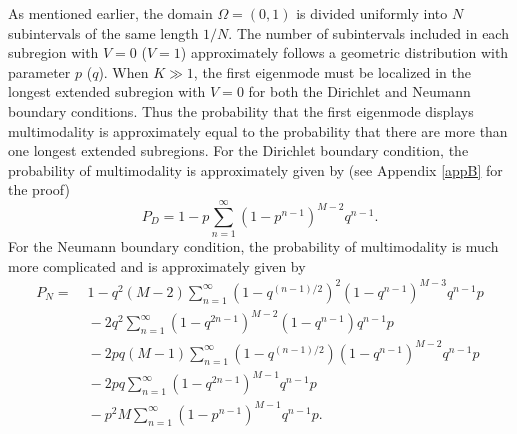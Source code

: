 \documentclass[a4paper,11pt]{article}
\begin{document}
As mentioned earlier, the domain $\Omega = (0, 1)$ is divided uniformly into $N$ subintervals of the same length $1/N$. The number of subintervals included in each subregion with $V = 0$ ($V = 1$) approximately follows a geometric distribution with parameter $p$ ($q$). When $K\gg 1$, the first eigenmode must be localized in the longest extended subregion with $V = 0$ for both the Dirichlet and Neumann boundary conditions. Thus the probability that the first eigenmode displays multimodality is approximately equal to the probability that there are more than one longest extended subregions. For the Dirichlet boundary condition, the probability of multimodality is approximately given by (see Appendix \ref{appB} for the proof)
\begin{equation}\label{multiD}
P_D = 1 - p \sum_{n=1}^{\infty} (1 - p^{n-1})^{M-2} q^{n-1}.
\end{equation}
For the Neumann boundary condition, the probability of multimodality is much more complicated and is approximately given by
\begin{equation}\label{multiN}
\begin{split}
P_N =&\; 1 - q^2 (M-2) \sum_{n=1}^{\infty} (1 - q^{(n-1)/2})^2 (1 - q^{n-1})^{M-3} q^{n-1} p \\
&\;- 2 q^2 \sum_{n=1}^{\infty} (1 - q^{2n-1})^{M-2} (1 - q^{n-1}) q^{n-1} p \\
&\;- 2 p q (M-1) \sum_{n=1}^{\infty} (1 - q^{(n-1)/2}) (1 - q^{n-1})^{M-2} q^{n-1} p \\
&\;- 2 p q \sum_{n=1}^{\infty} (1 - q^{2n-1})^{M-1} q^{n-1} p \\
&\;- p^2 M \sum_{n=1}^{\infty} (1 - p^{n-1})^{M-1} q^{n-1} p.
\end{split}
\end{equation}

\end{document}
